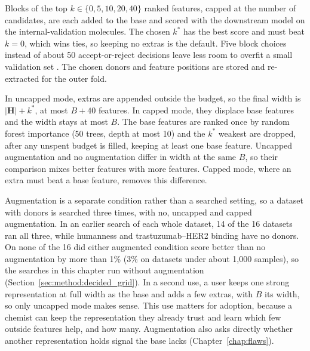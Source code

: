 Blocks of the top $k \in \{0, 5, 10, 20, 40\}$ ranked features, capped at the number of candidates, are each added to the base and scored with the downstream model on the internal-validation molecules. The chosen $k^*$ has the best score and must beat $k=0$, which wins ties, so keeping no extras is the default. Five block choices instead of about 50 accept-or-reject decisions leave less room to overfit a small validation set \citep{Cawley2010}. The chosen donors and feature positions are stored and re-extracted for the outer fold.

In uncapped mode, extras are appended outside the budget, so the final width is $|\mathbf{H}| + k^*$, at most $B + 40$ features. In capped mode, they displace base features and the width stays at most $B$. The base features are ranked once by random forest importance (50 trees, depth at most 10) and the $k^*$ weakest are dropped, after any unspent budget is filled, keeping at least one base feature. Uncapped augmentation and no augmentation differ in width at the same $B$, so their comparison mixes better features with more features. Capped mode, where an extra must beat a base feature, removes this difference.

Augmentation is a separate condition rather than a searched setting, so a dataset with donors is searched three times, with no, uncapped and capped augmentation. In an earlier search of each whole dataset, 14 of the 16 datasets ran all three, while humanness and trastuzumab--HER2 binding have no donors. On none of the 16 did either augmented condition score better than no augmentation by more than 1\% (3\% on datasets under about 1,000 samples), so the searches in this chapter run without augmentation (Section~\ref{sec:method:decided_grid}). In a second use, a user keeps one strong representation at full width as the base and adds a few extras, with $B$ its width, so only uncapped mode makes sense. This use matters for adoption, because a chemist can keep the representation they already trust and learn which few outside features help, and how many. Augmentation also asks directly whether another representation holds signal the base lacks (Chapter~\ref{chap:flaws}).

